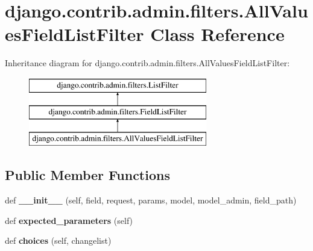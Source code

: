 \hypertarget{classdjango_1_1contrib_1_1admin_1_1filters_1_1_all_values_field_list_filter}{}\section{django.\+contrib.\+admin.\+filters.\+All\+Values\+Field\+List\+Filter Class Reference}
\label{classdjango_1_1contrib_1_1admin_1_1filters_1_1_all_values_field_list_filter}
Inheritance diagram for django.\+contrib.\+admin.\+filters.\+All\+Values\+Field\+List\+Filter\+:\begin{figure}[H]
\begin{center}
\leavevmode
\includegraphics[height=3.000000cm]{classdjango_1_1contrib_1_1admin_1_1filters_1_1_all_values_field_list_filter}
\end{center}
\end{figure}
\subsection*{Public Member Functions}
\begin{DoxyCompactItemize}
\item 
\mbox{\label{classdjango_1_1contrib_1_1admin_1_1filters_1_1_all_values_field_list_filter_a2733d62185708295d2d67bfaa6432e61}} 
def {\bfseries \+\_\+\+\_\+init\+\_\+\+\_\+} (self, field, request, params, model, model\+\_\+admin, field\+\_\+path)
\item 
\mbox{\label{classdjango_1_1contrib_1_1admin_1_1filters_1_1_all_values_field_list_filter_a164d171469f1e2f5ae986ebf63252b86}} 
def {\bfseries expected\+\_\+parameters} (self)
\item 
\mbox{\label{classdjango_1_1contrib_1_1admin_1_1filters_1_1_all_values_field_list_filter_aeea789f37432f14cd5ec3a186ff8b6ed}} 
def {\bfseries choices} (self, changelist)
\end{DoxyCompactItemize}
